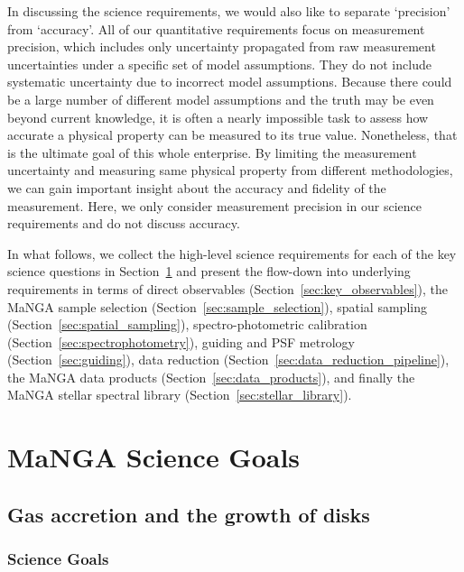 \documentclass[preprint,11pt]{aastex}
\begin{document}
In discussing the science requirements, we would also like to separate
`precision' from `accuracy'. All of our quantitative requirements
focus on measurement precision, which includes only uncertainty
propagated from raw measurement uncertainties under a specific set of
model assumptions. They do not include systematic uncertainty due to
incorrect model assumptions. Because there could be a large number of
different model assumptions and the truth may be even beyond current
knowledge, it is often a nearly impossible task to assess how accurate
a physical property can be measured to its true value. Nonetheless,
that is the ultimate goal of this whole enterprise. By limiting the
measurement uncertainty and measuring same physical property from
different methodologies, we can gain important insight about the
accuracy and fidelity of the measurement. Here, we only consider
measurement precision in our science requirements and do not discuss
accuracy.


In what follows, we collect the high-level science requirements for
each of the key science questions in Section~\ref{sec:key_science} and
present the flow-down into underlying requirements in terms of direct
observables (Section~\ref{sec:key_observables}), the MaNGA sample
selection (Section~\ref{sec:sample_selection}), spatial sampling
(Section~\ref{sec:spatial_sampling}), spectro-photometric calibration
(Section~\ref{sec:spectrophotometry}), guiding and PSF metrology
(Section~\ref{sec:guiding}), data reduction
(Section~\ref{sec:data_reduction_pipeline}), the MaNGA
data products (Section~\ref{sec:data_products}), and finally the MaNGA stellar spectral library (Section~\ref{sec:stellar_library}).



\newpage
\section{MaNGA Science Goals} \label{sec:key_science}

\subsection{Gas accretion and the growth of disks}
\label{sec:disk_growth}

\subsubsection{Science Goals}
\end{document}
